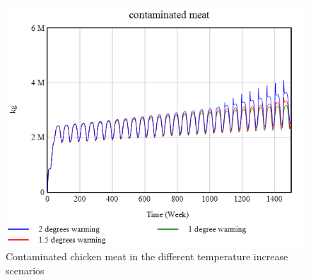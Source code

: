 \begin{figure}[h!]
\begin{minipage}{0.45\textwidth}
        \includegraphics[width=1\textwidth]{images/sensitivity/Temperature projection contaminated meat.png} %
        \caption{Contaminated chicken meat in the different temperature increase scenarios}
        \label{fig:temp_meat}
    \end{minipage}
\end{figure}

